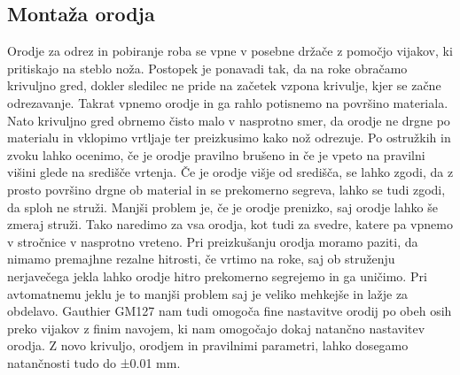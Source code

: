 \subsection{Montaža orodja}
Orodje za odrez in pobiranje roba se vpne v posebne držače
z pomočjo vijakov, ki pritiskajo na steblo noža. Postopek je ponavadi tak,
da na roke obračamo krivuljno gred, dokler sledilec ne pride
na začetek vzpona krivulje, kjer se začne odrezavanje. Takrat vpnemo orodje
in ga rahlo potisnemo na površino materiala. Nato krivuljno gred
obrnemo čisto malo v nasprotno smer, da orodje ne drgne po materialu
in vklopimo vrtljaje ter preizkusimo kako nož odrezuje. Po ostružkih
in zvoku lahko ocenimo, če je orodje pravilno brušeno in če je vpeto
na pravilni višini glede na središče vrtenja. Če je orodje višje od
središča, se lahko zgodi, da z prosto površino drgne ob material in
se prekomerno segreva, lahko se tudi zgodi, da sploh ne struži.
Manjši problem je, če je orodje prenizko, saj orodje lahko še zmeraj
struži. Tako naredimo za vsa orodja, kot tudi za svedre,
katere pa vpnemo v stročnice v nasprotno vreteno. Pri preizkušanju
orodja moramo paziti, da nimamo premajhne rezalne hitrosti, če
vrtimo na roke, saj ob struženju nerjavečega jekla lahko orodje
hitro prekomerno segrejemo in ga uničimo. Pri avtomatnemu jeklu
je to manjši problem saj je veliko mehkejše in lažje za obdelavo.
Gauthier GM127 nam tudi omogoča fine nastavitve orodij po obeh osih
preko vijakov z finim navojem, ki nam omogočajo dokaj natančno
nastavitev orodja. Z novo krivuljo, orodjem in pravilnimi parametri,
lahko dosegamo natančnosti tudo do ±0.01 mm.
